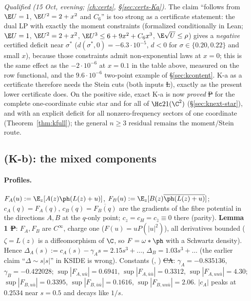 \emph{Qualified (15 Oct, evening; \autoref{ch:certs}, \S\ref{sec:certs-Ka}).} The claim ``follows from $\E U=1$, $\E U^2=2+x^2$ and $C_6$'' is too strong as a certificate statement: the dual LP with exactly the
moment constraints (formalized conditionally in Lean; $\E U=1$, $\E U^2=2+x^2$, $\E U^3\le6+9x^2+C_6x^3$, $\E\sqrt U\le\rho$) gives a \emph{negative} certified deficit near $\sigma^*$ ($d(\sigma^*,0)=-6.3\cdot10^{-5}$, $d<0$ for $\sigma\in\{0.20,0.22\}$ and small $x$), because
those constraints admit non-exponential laws at $x=0$; this is the same effect as the $-2\cdot10^{-6}$ at $x=0.1$ in the table above, measured on the row functional, and the $9.6\cdot10^{-6}$ two-point
example of \S\ref{sec:kcontent}. K-a as a certificate therefore needs the Stein cuts (both inputs \st{L}), exactly as the present lower certificate does. On the positive side, exact K-a is now
\emph{proved} \st{P} for the complete one-coordinate cubic star and for all of $\Hc21(\C^2)$ (\S\ref{sec:knext-star}), and with an explicit deficit for all nonzero-frequency sectors of one coordinate
(Theorem~\ref{thm:kfull}); the general $n\ge3$ residual remains the moment/Stein route.

\subsection{(K-b): the mixed components}\label{sec:Kb}
\paragraph{Profiles.} $F_A(u):=\E_z[A(z)\ph(L(z)+u)]$, $F_B(u):=\E_z[B(z)\overline{\ph(L(z)+u)}]$; $c_A(q)=F_A(q)$, $c_B(q)=\overline{F_B(q)}$ are the gradients of the
fibre potential in the directions $A,B$ at the $q$-only point; $c_z=c_H=c_{\bar z}\equiv0$ there (parity). \textbf{Lemma 1 \st{P}}: $F_A,F_B$ are $C^\infty$, charge one
($F(u)=uP(|u|^2)$), all derivatives bounded ($\zeta=L(z)$ is a diffeomorphism of $\C$, so $F=\omega*\ph$ with a Schwartz density). Hence
$\Delta_A(s):=c_A(s)-\gamma_As=2.15s^3+\ldots$, $\Delta_B=1.03s^3+\ldots$ (the earlier claim ``$\Delta\sim s|s|$'' in KSIDE is wrong). Constants
(, ) \st{CA}: $\gamma_A=-0.835136$, $\gamma_B=-0.422028$; $\sup|F_{A,u\bar u}|=0.6941$, $\sup|F_{A,\bar u\bar u}|=0.3312$,
$\sup|F_{A,uu\bar u}|=4.30$; $\sup|F_{B,u\bar u}|=0.3395$, $\sup|F_{B,\bar u\bar u}|=0.1616$, $\sup|F_{B,uu\bar u}|=2.06$. $|c_A|$ peaks at $0.2534$ near $s=0.5$ and decays like $1/s$.
